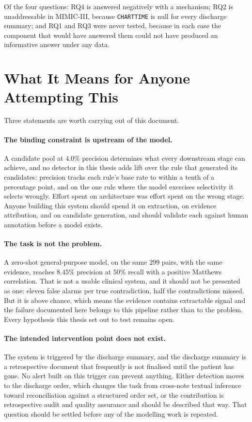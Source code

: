 Of the four questions: RQ4 is answered negatively with a mechanism; RQ2 is
unaddressable in MIMIC-III, because \texttt{CHARTTIME} is null for every
discharge summary; and RQ1 and RQ3 were never tested, because in each case the
component that would have answered them could not have produced an informative
answer under any data.

\section{What It Means for Anyone Attempting This}
\label{sec:conc-means}

Three statements are worth carrying out of this document.

\paragraph{The binding constraint is upstream of the model.} A candidate pool at
$4.0\%$ precision determines what every downstream stage can achieve, and no
detector in this thesis adds lift over the rule that generated its candidates:
precision tracks each rule's base rate to within a tenth of a percentage point,
and on the one rule where the model exercises selectivity it selects wrongly.
Effort spent on architecture was effort spent on the wrong stage. Anyone
building this system should spend it on extraction, on evidence attribution, and
on candidate generation, and should validate each against human annotation
before a model exists.

\paragraph{The task is not the problem.} A zero-shot general-purpose model, on
the same $299$ pairs, with the same evidence, reaches $8.45\%$ precision at
$50\%$ recall with a positive Matthews correlation. That is not a usable
clinical system, and it should not be presented as one: eleven false alarms per
true contradiction, half the contradictions missed. But it is above chance,
which means the evidence contains extractable signal and the failure documented
here belongs to this pipeline rather than to the problem. Every hypothesis this
thesis set out to test remains open.

\paragraph{The intended intervention point does not exist.} The system is
triggered by the discharge summary, and the discharge summary is a retrospective
document that frequently is not finalised until the patient has gone. No alert
built on this trigger can prevent anything. Either detection moves to the
discharge order, which changes the task from cross-note textual inference toward
reconciliation against a structured order set, or the contribution is
retrospective audit and quality assurance and should be described that way. That
question should be settled before any of the modelling work is repeated.

